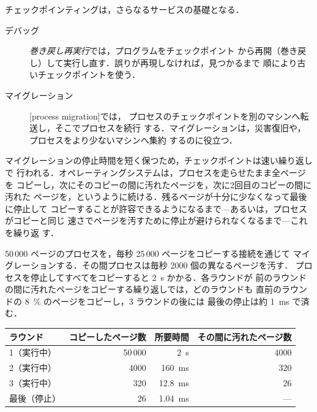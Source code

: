 \documentclass[../main.tex]{subfiles}
\begin{document}
チェックポインティングは，さらなるサービスの基礎となる．
\begin{description}
  \item[デバッグ] \emph{巻き戻し再実行}では，プログラムをチェックポイント
    から再開（巻き戻し）して実行し直す．誤りが再現しなければ，見つかるまで
    順により古いチェックポイントを使う．
  \item[マイグレーション]
    [process migration]では，
    プロセスのチェックポイントを別のマシンへ転送し，そこでプロセスを続行
    する．マイグレーションは，災害復旧や，プロセスをより少ないマシンへ集約
    するのに役立つ．
\end{description}
マイグレーションの停止時間を短く保つため，チェックポイントは速い繰り返しで
行われる．オペレーティングシステムは，プロセスを走らせたまま全ページを
コピーし，次にそのコピーの間に汚れたページを，次に2回目のコピーの間に汚れた
ページを，というように続ける．残るページが十分に少なくなって最後に停止して
コピーすることが許容できるようになるまで---あるいは，プロセスがコピーと同じ
速さでページを汚すために停止が避けられなくなるまで---これを繰り返
す．

\begin{example}
  50\,000 ページのプロセスを，毎秒 25\,000 ページをコピーする接続を通じて
  マイグレーションする．その間プロセスは毎秒 2000 個の異なるページを汚す．
  プロセスを停止してすべてをコピーすると \SI{2}{\second} かかる．各ラウンドが
  前のラウンドの間に汚れたページをコピーする繰り返しでは，どのラウンドも
  直前のラウンドの \SI{8}{\percent} のページをコピーし，3 ラウンドの後には
  最後の停止は約 \SI{1}{\milli\second} で済む．
  \begin{center}
    \small
    \begin{tabular}{@{}lrrr@{}}
      \toprule
      ラウンド & コピーしたページ数 & 所要時間 & その間に汚れたページ数 \\
      \midrule
      1（実行中） & 50\,000 & \SI{2}{\second}          & 4000 \\
      2（実行中） & 4000    & \SI{160}{\milli\second}  & 320 \\
      3（実行中） & 320     & \SI{12.8}{\milli\second} & 26 \\
      最後（停止） & 26     & \SI{1.04}{\milli\second} & --- \\
      \bottomrule
    \end{tabular}
  \end{center}
\end{example}
\end{document}
